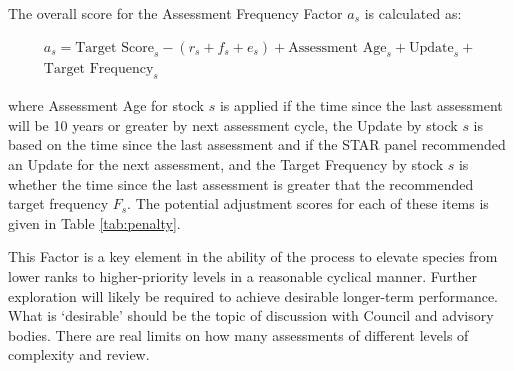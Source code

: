 \documentclass[11pt,
  english,
  a4paper,
]{article}
\begin{document}
\leavevmode\tagmcend\tagstructend\par


The overall score for the Assessment Frequency Factor {\(a_s\)\leavevmode\tagmcend\tagstructend} is calculated as:

\leavevmode\tagmcend\tagstructend\par


{\[
\begin{aligned}
a_s = \text{Target Score}_s - (r_s + f_s + e_s) + \text{Assessment Age}_s + \text{Update}_s + \\
\text{Target Frequency}_s 
\end{aligned}
\]\leavevmode\tagmcend\tagstructend}

\leavevmode\tagmcend\tagstructend\par


where Assessment Age for stock {\(s\)\leavevmode\tagmcend\tagstructend} is applied if the time since the last assessment will be 10 years or greater by next assessment cycle, the Update by stock {\(s\)\leavevmode\tagmcend\tagstructend} is based on the time since the last assessment and if the STAR panel recommended an Update for the next assessment, and the Target Frequency by stock {\(s\)\leavevmode\tagmcend\tagstructend} is whether the time since the last assessment is greater that the recommended target frequency {\(F_s\)\leavevmode\tagmcend\tagstructend}. The potential adjustment scores for each of these items is given in Table \ref{tab:penalty}.

\leavevmode\tagmcend\tagstructend\par


This Factor is a key element in the ability of the process to elevate species from lower ranks to higher-priority levels in a reasonable cyclical manner. Further exploration will likely be required to achieve desirable longer-term performance. What is `desirable' should be the topic of discussion with Council and advisory bodies. There are real limits on how many assessments of different levels of complexity and review.
\end{document}
